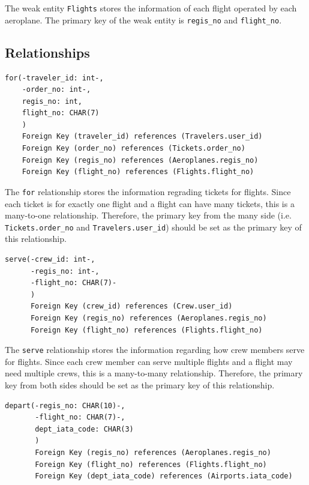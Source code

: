 \documentclass{article}
\begin{document}
	The weak entity \texttt{Flights} stores the information of each flight operated by each aeroplane. The primary key of the weak entity is \texttt{regis\_no} and \texttt{flight\_no}.

	\subsection{Relationships}
	
	\begin{lstlisting}[keepspaces=true]
for(-traveler_id: int-, 
    -order_no: int-,
    regis_no: int, 
    flight_no: CHAR(7)
    )
    Foreign Key (traveler_id) references (Travelers.user_id)
    Foreign Key (order_no) references (Tickets.order_no)
    Foreign Key (regis_no) references (Aeroplanes.regis_no)
    Foreign Key (flight_no) references (Flights.flight_no)
	\end{lstlisting}    

	The \texttt{for} relationship stores the information regrading tickets for flights. Since each ticket is for exactly one flight and a flight can have many tickets, this is a many-to-one relationship. Therefore, the primary key from the many side (i.e. \texttt{Tickets.order\_no} and \texttt{Travelers.user\_id}) should be set as the primary key of this relationship.

	\begin{lstlisting}[keepspaces=true]        
serve(-crew_id: int-, 
      -regis_no: int-, 
      -flight_no: CHAR(7)-
      )
      Foreign Key (crew_id) references (Crew.user_id)
      Foreign Key (regis_no) references (Aeroplanes.regis_no)
      Foreign Key (flight_no) references (Flights.flight_no)
	\end{lstlisting}    

	The \texttt{serve} relationship stores the information regarding how crew members serve for flights. Since each crew member can serve multiple flights and a flight may need multiple crews, this is a many-to-many relationship. Therefore, the primary key from both sides should be set as the primary key of this relationship.

	\begin{lstlisting}[keepspaces=true] 
depart(-regis_no: CHAR(10)-,
       -flight_no: CHAR(7)-,
       dept_iata_code: CHAR(3)
       )  
       Foreign Key (regis_no) references (Aeroplanes.regis_no)
       Foreign Key (flight_no) references (Flights.flight_no)
       Foreign Key (dept_iata_code) references (Airports.iata_code)
	\end{lstlisting}    
\end{document}
